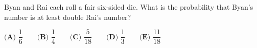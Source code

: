 Byan and Rai each roll a fair six-sided die. What is the probability that Byan's number is at least double Rai's number?

$\textbf{(A) }\dfrac{1}{6}\qquad\textbf{(B) }\dfrac{1}{4}\qquad\textbf{(C) }\dfrac{5}{18}\qquad\textbf{(D) }\dfrac{1}{3}\qquad\textbf{(E) }\dfrac{11}{18}$
